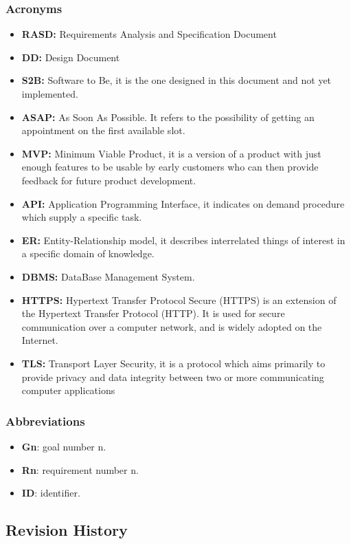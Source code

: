 \documentclass[table, 12pt]{article}
\begin{document}
\subsubsection{Acronyms}
\begin{itemize}
    \item \textbf{RASD:} Requirements Analysis and Specification Document
    \item \textbf{DD:} Design Document
    \item \textbf{S2B:} Software to Be, it is the one designed in this document and not yet implemented.
    \item \textbf{ASAP:} As Soon As Possible. It refers to the possibility of getting an appointment on the first available slot.
    \item \textbf{MVP:} Minimum Viable Product, it is a version of a product with just enough features to be usable by early customers who can then provide feedback for future product development.
    \item \textbf{API:} Application Programming Interface, it indicates on demand procedure which supply a specific task.
    \item \textbf{ER:} Entity-Relationship model, it describes interrelated things of interest in a specific domain of knowledge.
    \item \textbf{DBMS:} DataBase Management System.
    \item \textbf{HTTPS:} Hypertext Transfer Protocol Secure (HTTPS) is an extension of the Hypertext Transfer Protocol (HTTP). It is used for secure communication over a computer network, and is widely adopted on the Internet.
    \item \textbf{TLS:} Transport Layer Security, it is a protocol which aims primarily to provide privacy and data integrity between two or more communicating computer applications
\end{itemize}

\subsubsection{Abbreviations}
\begin{itemize}
    \item \textbf{Gn}: goal number n.
    \item \textbf{Rn}: requirement number n.
    \item \textbf{ID}: identifier.
\end{itemize}

\subsection{Revision History}
\end{document}
